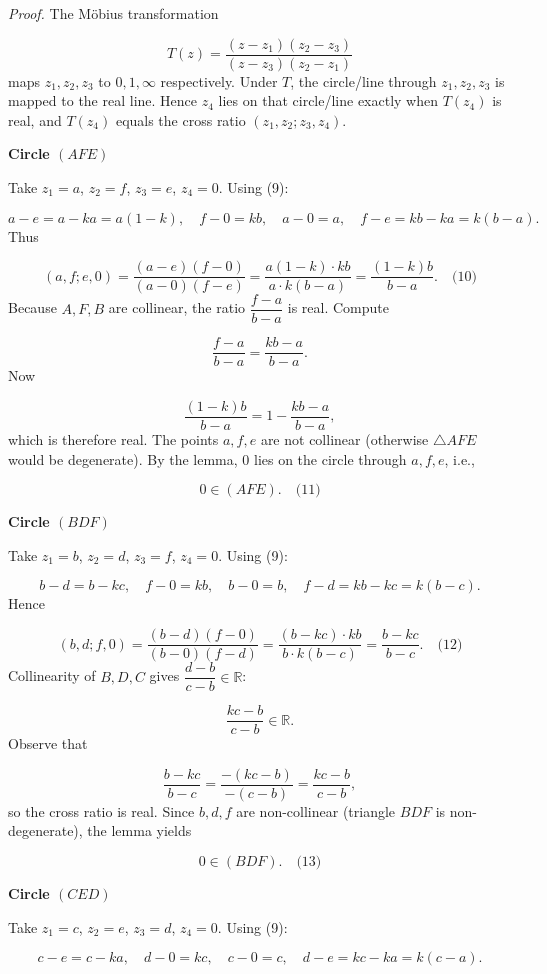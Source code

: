 \documentclass{llmxive}
\providecommand{\solutionheading}[1]{\par\smallskip\noindent\textbf{#1}\par}
\begin{document}
\emph{Proof.} The M\"obius transformation\par
\[
T(z) = \frac{(z - z_1)(z_2 - z_3)}{(z - z_3)(z_2 - z_1)}
\]
maps \(z_1,z_2,z_3\) to \(0,1,\infty\) respectively. Under \(T\), the circle/line through \(z_1,z_2,z_3\) is mapped to the real line. Hence \(z_4\) lies on that circle/line exactly when \(T(z_4)\) is real, and \(T(z_4)\) equals the cross ratio \((z_1,z_2;z_3,z_4)\).\par
\smallskip
\solutionheading{Circle \((AFE)\)}
Take \(z_1 = a\), \(z_2 = f\), \(z_3 = e\), \(z_4 = 0\). Using (9):\par
\[
a - e = a - k a = a(1 - k),\quad f - 0 = k b,\quad a - 0 = a,\quad f - e = k b - k a = k(b - a).
\]
Thus\par
\[
(a,f;e,0) = \frac{(a - e)(f - 0)}{(a - 0)(f - e)} = \frac{a(1 - k) \cdot k b}{a \cdot k(b - a)} = \frac{(1 - k)b}{b - a}. \quad\text{(10)}
\]
Because \(A,F,B\) are collinear, the ratio \(\dfrac{f - a}{b - a}\) is real. Compute\par
\[
\frac{f - a}{b - a} = \frac{k b - a}{b - a}.
\]
Now\par
\[
\frac{(1 - k)b}{b - a} = 1 - \frac{k b - a}{b - a},
\]
which is therefore real. The points \(a,f,e\) are not collinear (otherwise \(\triangle AFE\) would be degenerate). By the lemma, \(0\) lies on the circle through \(a,f,e\), i.e.,\par
\[
0 \in (AFE). \quad\text{(11)}
\]
\smallskip
\solutionheading{Circle \((BDF)\)}
Take \(z_1 = b\), \(z_2 = d\), \(z_3 = f\), \(z_4 = 0\). Using (9):\par
\[
b - d = b - k c,\quad f - 0 = k b,\quad b - 0 = b,\quad f - d = k b - k c = k(b - c).
\]
Hence\par
\[
(b,d;f,0) = \frac{(b - d)(f - 0)}{(b - 0)(f - d)} = \frac{(b - k c) \cdot k b}{b \cdot k(b - c)} = \frac{b - k c}{b - c}. \quad\text{(12)}
\]
Collinearity of \(B,D,C\) gives \(\dfrac{d - b}{c - b} \in \mathbb{R}\):\par
\[
\frac{k c - b}{c - b} \in \mathbb{R}.
\]
Observe that\par
\[
\frac{b - k c}{b - c} = \frac{-(k c - b)}{-(c - b)} = \frac{k c - b}{c - b},
\]
so the cross ratio is real. Since \(b,d,f\) are non-collinear (triangle \(BDF\) is non-degenerate), the lemma yields\par
\[
0 \in (BDF). \quad\text{(13)}
\]
\smallskip
\solutionheading{Circle \((CED)\)}
Take \(z_1 = c\), \(z_2 = e\), \(z_3 = d\), \(z_4 = 0\). Using (9):\par
\[
c - e = c - k a,\quad d - 0 = k c,\quad c - 0 = c,\quad d - e = k c - k a = k(c - a).
\]
\end{document}

